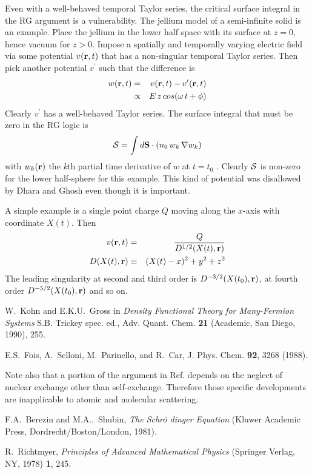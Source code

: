 \begin{references}
 Even with a well-behaved temporal Taylor series, the
critical surface integral in the RG argument is a vulnerability. The jellium
model of a semi-infinite solid is an example. Place the jellium in the lower
half space with its surface at $z=0$, hence vacuum for $z>0$. Impose a
spatially and temporally varying electric field via some potential $v({\bf r}%
,t)$ that has a non-singular temporal Taylor series. Then pick another
potential $v^\prime$ such that the difference is 
\begin{eqnarray}
w({\bf r},t) & = & v({\bf r},t) - v^{\prime}({\bf r},t)  \nonumber \\
& \propto & E \, z \, cos(\omega \, t + \phi)  \nonumber
\end{eqnarray}
Clearly $v^\prime$ has a well-behaved Taylor series. The surface integral
that must be zero in the RG logic is 
\[
{\cal S} = \int d{\bf S}\cdot ( n_{0} \, w_{k} \, \nabla w_{k} ) %
\]
with $w_{k}({\bf r})$ the {\it k}th partial time derivative of $w$ at $t=t_0$
. Clearly ${\cal S}$ is non-zero for the lower half-sphere for this example.
This kind of potential was disallowed by Dhara and Ghosh \cite{Dhara87} even
though it is important.

 A simple example is a single point charge $Q$ moving
along the $x$-axis with coordinate $X(t)$. Then 
\begin{eqnarray}
v({\bf r},t) & = & \frac{Q}{D^{1/2}(X(t),{\bf r})}  \nonumber \\
D(X(t),{\bf r}) & \equiv & (X(t) -x)^{2} + y^{2} + z^{2}  \nonumber
\end{eqnarray}
The leading singularity at second and third order is $D^{-3/2}(X(t_{0}),{\bf %
r})$, at fourth order $D^{-5/2}(X(t_{0}),{\bf r})$ and so on.

 W.~Kohn and E.K.U.~Gross in {\it Density Functional
Theory for Many-Fermion Systems} S.B. Trickey spec. ed., Adv. Quant. Chem. 
{\bf 21} (Academic, San Diego, 1990), 255.

 E.S.~Fois, A.~Selloni, M.~Parinello, and R.~Car, J. Phys.
Chem. {\bf 92}, 3268 (1988).

 Note also that a portion of the argument in Ref. \cite%
{Gross96} depends on the neglect of nuclear exchange other than
self-exchange. Therefore those specific developments are inapplicable to
atomic and molecular scattering.

 F.A.~Berezin and M.A..~Shubin, {\it The Schr\"o%
dinger Equation} (Kluwer Academic Press, Dordrecht/Boston/London, 1981).

 R.~Richtmyer, {\it Principles of Advanced Mathematical
Physics} (Springer Verlag, NY, 1978) {\bf 1}, 245.
\end{references}



